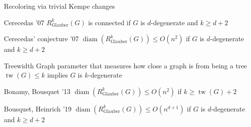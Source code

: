 \documentclass[11pt,xcolor=dvipsnames,presentation]{beamer}
\DeclareMathOperator{\diam}{diam}
\DeclareMathOperator{\tw}{tw}
\begin{document}
\begin{frame}{Recoloring via trivial Kempe changes}

  \begin{block}{Cerecedas '07}
    $R_{\text{Glauber}}^k(G)$ is connected if $G$ is $d$-degenerate and $k \ge d+2$
  \end{block}

  \begin{alertblock}{Cerecedas' conjecture '07}
    $\diam(R_{\text{Glauber}}^k(G)) \le O(n^2)$ if $G$ is $d$-degenerate and $k \ge d+2$
  \end{alertblock}

  \pause
  
  \begin{exampleblock}{Treewidth}
    Graph parameter that measures how close a graph is from being a tree\\
    $\tw(G) \le k$ implies $G$ is  $k$-degenerate
  \end{exampleblock}

  \begin{block}{Bonamy, Bousquet '13}
    $\diam(R_{\text{Glauber}}^k(G)) \le O(n^2)$ if $k \ge \tw(G) + 2$
  \end{block}

  \pause
  \begin{block}{Bousquet, Heinrich '19}
    $\diam(R_{\text{Glauber}}^k(G)) \le O(n^{d+1})$ if $G$ is $d$-degenerate and $k \ge d+2$
  \end{block}
  
\end{frame}
\end{document}
